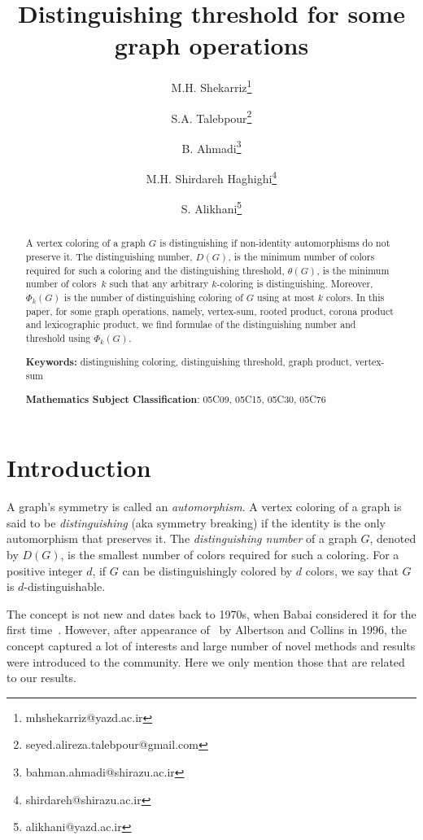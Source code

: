 \documentclass[12pt,a4paper, longbibliography]{article}
\date{}
\title{Distinguishing threshold for some graph operations}
\author[1]{\small M.H. Shekarriz\thanks{mhshekarriz@yazd.ac.ir}}
\affil[1]{Department of Mathematics, Yazd University, 89195-741, Yazd, Iran.}
\author[2]{S.A. Talebpour\thanks{seyed.alireza.talebpour@gmail.com}}
\author[2]{B. Ahmadi\thanks{bahman.ahmadi@shirazu.ac.ir}}
\author[2]{M.H. Shirdareh Haghighi\thanks{shirdareh@shirazu.ac.ir}}
\author[1]{S. Alikhani\thanks{alikhani@yazd.ac.ir}}
\affil[2]{Department of Mathematics, Shiraz University, Shiraz, Iran}
\newcommand{\id}{\ensuremath{\text{\rm id}}}
\newcommand{\aut}{\mathrm{Aut}}
\theoremstyle{definition}
\numberwithin{equation}{section}
\begin{document}
	
	
	\maketitle
	\begin{abstract}
		A vertex coloring of a graph $G$ is distinguishing if non-identity automorphisms do not preserve it. The distinguishing number, $D(G)$, is the minimum number of colors required for such a coloring and the distinguishing threshold, $\theta(G)$, is the minimum number of colors~$k$ such that any arbitrary $k$-coloring is distinguishing. Moreover, $\Phi_k (G)$ is the number of distinguishing coloring of $G$ using at most $k$ colors. In this paper, for some graph operations, namely, vertex-sum, rooted product, corona product and lexicographic product, we find formulae of the distinguishing number and threshold using $\Phi_k (G)$. 
		
		\noindent\textbf{Keywords:} {distinguishing coloring, distinguishing threshold, graph product, vertex-sum}
		
		\noindent\textbf{Mathematics Subject Classification}: 05C09, 05C15, 05C30, 05C76
	\end{abstract}
	
		
	

	
	\section{Introduction}\label{intro}
	
	
	
	A graph's symmetry is called an \emph{automorphism}. A vertex coloring of a graph is said to be \emph{distinguishing} (aka symmetry breaking) if the identity is the only automorphism that preserves it. The \emph{distinguishing number} of a graph $G$, denoted by $D(G)$, is the smallest number of colors required for such a coloring. For a positive integer $d$, if $G$ can be distinguishingly  colored by $d$ colors, we say that $G$ is $d$-distinguishable. %
	
	The concept is not new and dates back  to 1970s, when Babai considered it for the first time~\cite{Babai1977}. However, after appearance of~\cite{albertson1996symmetry} by Albertson and Collins in 1996, the concept captured a lot of interests and large number of novel methods and results were introduced to the community. Here we only mention those that are related to our results.
	
\end{document}
